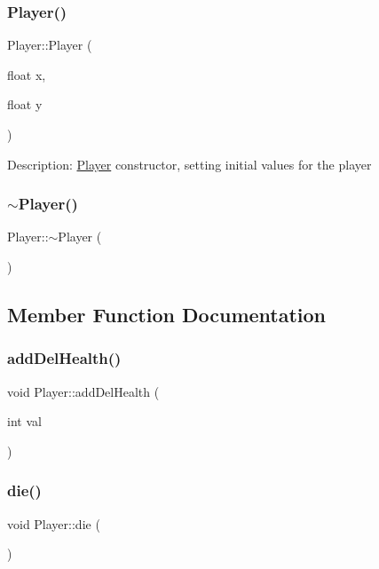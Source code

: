 \subsubsection{\texorpdfstring{Player()}{Player()}}
{\footnotesize\ttfamily Player\+::\+Player (\begin{DoxyParamCaption}\item[{float}]{x,  }\item[{float}]{y }\end{DoxyParamCaption})}

Description\+: \mbox{\hyperlink{class_player}{Player}} constructor, setting initial values for the player \mbox{\label{class_player_a749d2c00e1fe0f5c2746f7505a58c062}} 
\subsubsection{\texorpdfstring{$\sim$Player()}{~Player()}}
{\footnotesize\ttfamily Player\+::$\sim$\+Player (\begin{DoxyParamCaption}{ }\end{DoxyParamCaption})\hspace{0.3cm}{\ttfamily [inline]}}



\subsection{Member Function Documentation}
\mbox{\label{class_player_ae05f7bcbebe0c8e284f9138db51be539}} 
\subsubsection{\texorpdfstring{addDelHealth()}{addDelHealth()}}
{\footnotesize\ttfamily void Player\+::add\+Del\+Health (\begin{DoxyParamCaption}\item[{int}]{val }\end{DoxyParamCaption})}

\mbox{\label{class_player_a1e4b3e6ef91fc400ff2c6c26b1370f8c}} 
\subsubsection{\texorpdfstring{die()}{die()}}
{\footnotesize\ttfamily void Player\+::die (\begin{DoxyParamCaption}{ }\end{DoxyParamCaption})}

